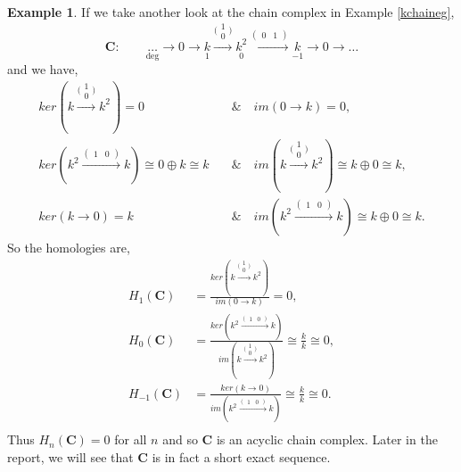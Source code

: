 \documentclass[11.5pt, twoside, a4paper, titlepage]{report}
\theoremstyle{definition}
\newtheorem{eg}[mydef]{Example}
\theoremstyle{plain}
\begin{document}
\begin{eg}
If we take another look at the chain complex in Example \ref{kchaineg},
\begin{equation*}
\mathbf{C}: \qquad \underset{\text{deg}}{\dots} \xrightarrow{} 0 \xrightarrow{} \underset{1}{k} \xrightarrow{\big(\begin{smallmatrix} 1\\ 0 \end{smallmatrix}\big)} \underset{0}{k^2} \xrightarrow{(\begin{smallmatrix}0 & 1 \end{smallmatrix})}\underset{-1}{k} \xrightarrow{} 0 \xrightarrow{} \dots
\end{equation*}
and we have, 
\begin{align*}
ker(k\xrightarrow{\big(\begin{smallmatrix} 1\\ 0 \end{smallmatrix}\big)}k^2)=0 \quad &\& \quad im(0 \xrightarrow{}k)=0,\\
ker(k^2\xrightarrow{(\begin{smallmatrix} 1 & 0 \end{smallmatrix})}k) \cong 0\oplus k \cong k \quad &\& \quad im(k\xrightarrow{\big(\begin{smallmatrix} 1\\ 0 \end{smallmatrix}\big)}k^2)\cong k \oplus 0\cong k,\\
ker(k\xrightarrow{}0)=k \quad &\& \quad im(k^2\xrightarrow{(\begin{smallmatrix} 1 & 0 \end{smallmatrix})}k)\cong k \oplus 0 \cong k.
\end{align*}
So the homologies are, 
\begin{align*}
H_1(\mathbf{C}) &=\frac{ker(k\xrightarrow{\big(\begin{smallmatrix} 1\\ 0 \end{smallmatrix}\big)}k^2)}{im(0 \xrightarrow{}k)}= 0,\\
H_0(\mathbf{C}) &=\frac{ker(k^2\xrightarrow{(\begin{smallmatrix} 1 & 0 \end{smallmatrix})}k)}{im(k\xrightarrow{\big(\begin{smallmatrix} 1\\ 0 \end{smallmatrix}\big)}k^2)}\cong \frac{k}{k} \cong 0,\\
H_{-1}(\mathbf{C}) &=\frac{ker(k\xrightarrow{}0)}{im(k^2\xrightarrow{(\begin{smallmatrix} 1 & 0 \end{smallmatrix})}k)}\cong \frac{k}{k} \cong 0.\\
\end{align*}
Thus $H_n(\mathbf{C})=0$ for all $n$ and so $\mathbf{C}$ is an acyclic chain complex. Later in the report, we will see that $\mathbf{C}$ is in fact a short exact sequence.
\end{eg}
\end{document}
